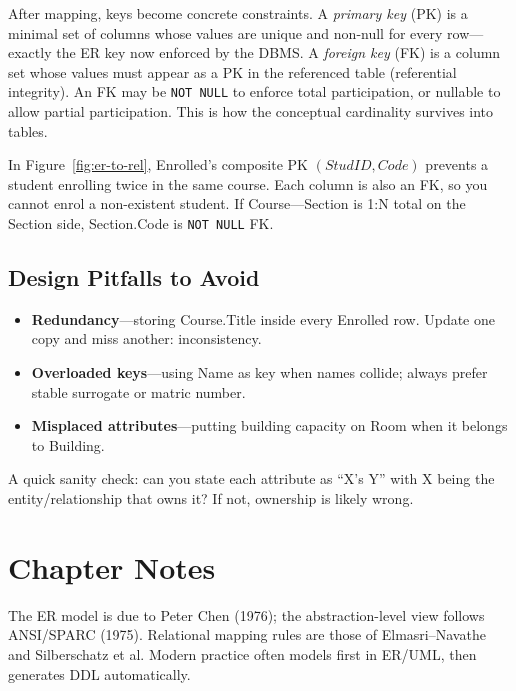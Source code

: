 After mapping, keys become concrete constraints. A \emph{primary key} (PK) is a minimal set of columns whose values are unique and non-null for every row---exactly the ER key now enforced by the DBMS. A \emph{foreign key} (FK) is a column set whose values must appear as a PK in the referenced table (referential integrity). An FK may be \texttt{NOT NULL} to enforce total participation, or nullable to allow partial participation. This is how the conceptual cardinality survives into tables.

\begin{example}
In Figure~\ref{fig:er-to-rel}, Enrolled's composite PK $(\mathit{StudID},\mathit{Code})$ prevents a student enrolling twice in the same course. Each column is also an FK, so you cannot enrol a non-existent student. If Course---Section is 1:N total on the Section side, Section.Code is \texttt{NOT NULL} FK.
\end{example}

\subsection{Design Pitfalls to Avoid}

\begin{itemize}
    \item \textbf{Redundancy}---storing Course.Title inside every Enrolled row. Update one copy and miss another: inconsistency.
    \item \textbf{Overloaded keys}---using Name as key when names collide; always prefer stable surrogate or matric number.
    \item \textbf{Misplaced attributes}---putting building capacity on Room when it belongs to Building.
\end{itemize}
A quick sanity check: can you state each attribute as ``X's Y'' with X being the entity/relationship that owns it? If not, ownership is likely wrong.

\section{Chapter Notes}

The ER model is due to Peter Chen (1976); the abstraction-level view follows ANSI/SPARC (1975). Relational mapping rules are those of Elmasri--Navathe and Silberschatz et al. Modern practice often models first in ER/UML, then generates DDL automatically.

